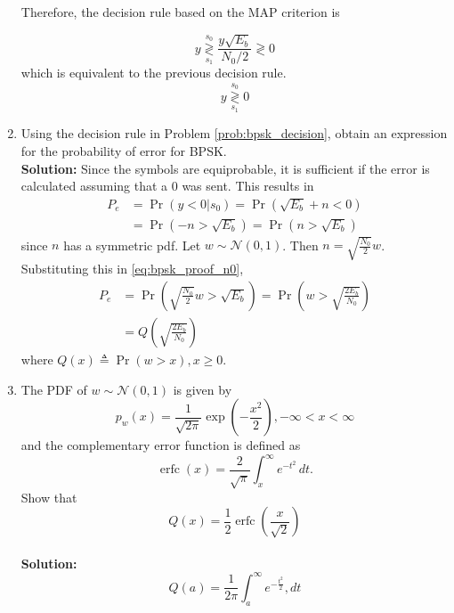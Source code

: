 \documentclass[12pt]{book}
\providecommand{\pr}[1]{\ensuremath{\Pr\left(#1\right)}}
\providecommand{\qfunc}[1]{\ensuremath{Q\left(#1\right)}}
\providecommand{\brak}[1]{\ensuremath{\left(#1\right)}}
\newcommand{\solution}{\noindent \textbf{Solution: }}
\providecommand{\dec}[2]{\ensuremath{\overset{#1}{\underset{#2}{\gtrless}}}}
\providecommand{\gauss}[2]{\mathcal{N}\ensuremath{\left(#1,#2\right)}}
\begin{document}
\begin{enumerate}
Therefore, the decision rule based on the MAP criterion is

\begin{equation}
y \dec{s_0}{s_1} \frac{y \sqrt{E_b}}{N_0/2} \gtrless 0
\end{equation}
which is equivalent to the previous decision rule.
\begin{equation}
y \dec{s_0}{s_1} 0
\end{equation}
\item
Using the decision rule in Problem \ref{prob:bpsk_decision}, obtain an expression for the probability of error for BPSK.\\

\solution
Since the symbols are equiprobable, it is sufficient if the error is calculated assuming that a 0 was sent.  This results in
\begin{align}
P_e &= \pr{y < 0|s_0} = \pr{\sqrt{E_b} + n < 0}
\\
&= \pr{ -n > \sqrt{E_b} } = \pr{ n > \sqrt{E_b} }
\label{eq:bpsk_proof_n0}
\end{align}
since $n$ has a symmetric pdf.
Let $w \sim \gauss{0}{1}$.  Then $n = \sqrt{\frac{N_0}{2}}w$. Substituting this in \eqref{eq:bpsk_proof_n0},
\begin{align}
P_e &=  \pr{ \sqrt{\frac{N_0}{2}}w > \sqrt{E_b} } = \pr{ w > \sqrt{\frac{2E_b}{N_0}} }
\\
&= \qfunc{\sqrt{\frac{2E_b}{N_0}}}
\end{align}
%
where $\qfunc{x} \triangleq \pr{w > x}, x \ge 0$.


\item
The PDF of $w \sim \gauss{0}{1}$ is given by
%
\begin{equation}
p_{w}(x) = \frac{1}{\sqrt{2\pi}}\exp\brak{-\frac{x^2}{2}}, -\infty < x < \infty
\end{equation}
and the complementary error function is defined as
\begin{equation}
\operatorname {erfc} (x)={\frac {2}{\sqrt {\pi }}}\int _{x}^{\infty }e^{-t^{2}}\,dt.
\end{equation}
%
Show that 
\begin{equation}
Q(x) = \frac{1}{2}\operatorname {erfc}\left({\frac  {x}{{\sqrt  {2}}}}\right)
\end{equation}\\
\solution
\begin{equation}
Q(a) = \frac{1}{2\pi}\int^{\infty}_{a}e^{-\frac{t^2}{2}},dt
\end{equation}


\end{enumerate}
\end{document}
